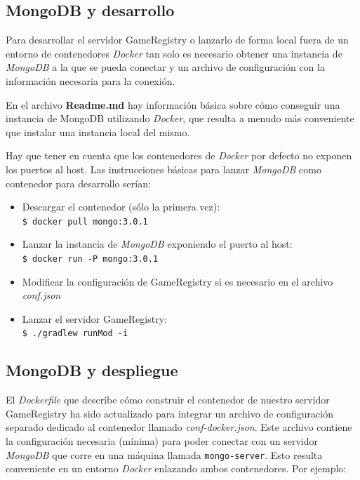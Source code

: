 \subsection{MongoDB y desarrollo}
Para desarrollar el servidor GameRegistry o lanzarlo de forma local fuera de un entorno
de contenedores \emph{Docker} tan solo es necesario obtener una instancia de \emph{MongoDB}
a la que se pueda conectar y un archivo de configuración con la información necesaria para
la conexión.

En el archivo \textbf{Readme.md} hay información básica sobre cómo conseguir una instancia
de MongoDB utilizando \emph{Docker}, que resulta a menudo más conveniente que instalar una
instancia local del mismo.

Hay que tener en cuenta que los contenedores de \emph{Docker} por defecto no exponen los puertos
al host. Las instrucciones básicas para lanzar \emph{MongoDB} como contenedor para desarrollo 
serían:

\begin{itemize}
 \item Descargar el contenedor (sólo la primera vez): \\
       \texttt{\$ docker pull mongo:3.0.1}
 \item Lanzar la instancia de \emph{MongoDB} exponiendo el puerto al host: \\
       \texttt{\$ docker run -P mongo:3.0.1}
 \item Modificar la configuración de GameRegistry si es necesario en el archivo \emph{conf.json}
 \item Lanzar el servidor GameRegistry: \\
       \texttt{\$ ./gradlew runMod -i}
\end{itemize}

\subsection{MongoDB y despliegue}
El \emph{Dockerfile} que describe cómo construir el contenedor de nuestro servidor GameRegistry
ha sido actualizado para integrar un archivo de configuración separado dedicado al contenedor 
llamado \emph{conf-docker.json}. Este archivo contiene la configuración necesaria (mínima) para
poder conectar con un servidor \emph{MongoDB} que corre en una máquina llamada \texttt{mongo-server}.
Esto resulta conveniente en un entorno \emph{Docker} enlazando ambos contenedores. Por ejemplo:

